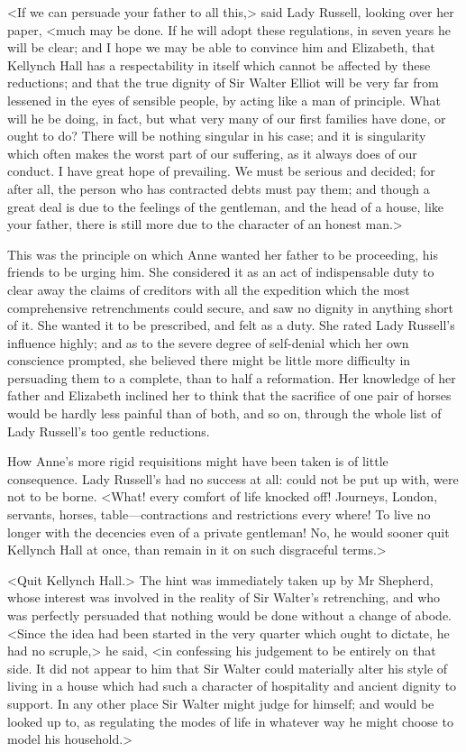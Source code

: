 <If we can persuade your father to all this,> said Lady Russell, looking over her paper, <much may be done. If he will adopt these regulations, in seven years he will be clear; and I hope we may be able to convince him and Elizabeth, that Kellynch Hall has a respectability in itself which cannot be affected by these reductions; and that the true dignity of Sir Walter Elliot will be very far from lessened in the eyes of sensible people, by acting like a man of principle. What will he be doing, in fact, but what very many of our first families have done, or ought to do? There will be nothing singular in his case; and it is singularity which often makes the worst part of our suffering, as it always does of our conduct. I have great hope of prevailing. We must be serious and decided; for after all, the person who has contracted debts must pay them; and though a great deal is due to the feelings of the gentleman, and the head of a house, like your father, there is still more due to the character of an honest man.>

This was the principle on which Anne wanted her father to be proceeding, his friends to be urging him. She considered it as an act of indispensable duty to clear away the claims of creditors with all the expedition which the most comprehensive retrenchments could secure, and saw no dignity in anything short of it. She wanted it to be prescribed, and felt as a duty. She rated Lady Russell's influence highly; and as to the severe degree of self-denial which her own conscience prompted, she believed there might be little more difficulty in persuading them to a complete, than to half a reformation. Her knowledge of her father and Elizabeth inclined her to think that the sacrifice of one pair of horses would be hardly less painful than of both, and so on, through the whole list of Lady Russell's too gentle reductions.

How Anne's more rigid requisitions might have been taken is of little consequence. Lady Russell's had no success at all: could not be put up with, were not to be borne. <What! every comfort of life knocked off! Journeys, London, servants, horses, table—contractions and restrictions every where! To live no longer with the decencies even of a private gentleman! No, he would sooner quit Kellynch Hall at once, than remain in it on such disgraceful terms.>

<Quit Kellynch Hall.> The hint was immediately taken up by Mr Shepherd, whose interest was involved in the reality of Sir Walter's retrenching, and who was perfectly persuaded that nothing would be done without a change of abode. <Since the idea had been started in the very quarter which ought to dictate, he had no scruple,> he said, <in confessing his judgement to be entirely on that side. It did not appear to him that Sir Walter could materially alter his style of living in a house which had such a character of hospitality and ancient dignity to support. In any other place Sir Walter might judge for himself; and would be looked up to, as regulating the modes of life in whatever way he might choose to model his household.>

